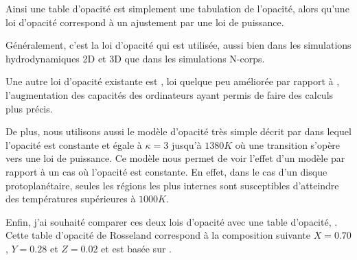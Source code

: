 Ainsi une table d'opacité est simplement une tabulation de l'opacité, alors qu'une loi d'opacité correspond à un ajustement par
une loi de puissance. 

\bigskip

Généralement, c'est la loi d'opacité \cite{bell1994FU} qui est utilisée, aussi bien dans les simulations hydrodynamiques 2D et
3D que dans les simulations N-corps. 

Une autre loi d'opacité existante est \cite{zhu2009nonsteady}, loi quelque peu améliorée par rapport à \cite{bell1994FU},
l'augmentation des capacités des ordinateurs ayant permis de faire des calculs plus précis. 

De plus, nous utilisons aussi le modèle d'opacité très simple décrit par \cite{chambers2009analytic} dans lequel l'opacité est
constante et égale à $\kappa=3$ jusqu'à $1380\unit{K}$ où une transition s'opère vers une loi de puissance. Ce modèle nous
permet de voir l'effet d'un modèle par rapport à un cas où l'opacité est constante. En effet, dans le cas d'un disque
protoplanétaire, seules les régions les plus internes sont susceptibles d'atteindre des températures supérieures à
$1000\unit{K}$. 

Enfin, j'ai souhaité comparer ces deux lois d'opacité avec une table d'opacité, \cite{hure2000transition}. Cette table
d'opacité de Rosseland correspond à la composition suivante $X=0.70$, $Y=0.28$ et $Z=0.02$ et est basée sur
\cite{seaton1994opacities, alexander1994low, henning1996dust}.

